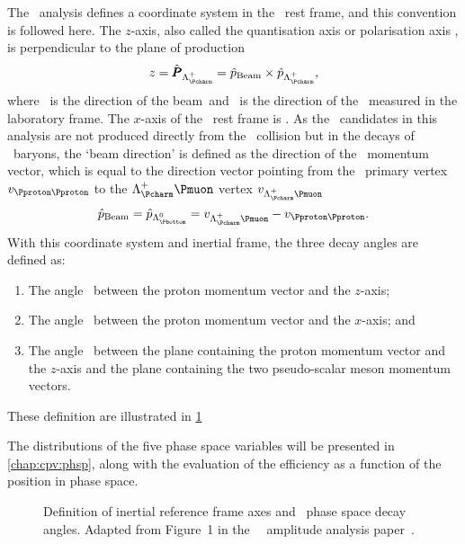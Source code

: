 The \esno\ analysis defines a coordinate system in the \PLambdac\ rest frame, 
and this convention is followed here.
The $z$-axis, also called the quantisation axis or polarisation axis \polzlcp, 
is perpendicular to the plane of production
\begin{equation}
  z = \polzlcp = \phatbeam \times \phatlcp,
\end{equation}
where \phatbeam\ is the direction of the beam\footnotemark\ and \phatlcp\ is 
the direction of the \PLambdac\ measured in the laboratory frame.
The $x$-axis of the \PLambdac\ rest frame is \phatlcp.
As the \PLambdac\ candidates in this analysis are not produced directly from 
the \pp\ collision but in the decays of \PLambdab\ baryons, the `beam 
direction' is defined as the direction of the \PLambdab\ momentum vector, which 
is equal to the direction vector pointing from the \pp\ primary vertex 
$v_{\pp}$ to the $\PLambdac\Pmuon$ vertex $v_{\PLambdac\Pmuon}$
\begin{equation}
  \phatbeam = \phatlbz = v_{\PLambdac\Pmuon} - v_{\pp}.
\end{equation}
With this coordinate system and inertial frame, the three decay angles are 
defined as:
\begin{enumerate}
  \item The angle \thetap\ between the proton momentum vector and the $z$-axis;
  \item The angle \phip\ between the proton momentum vector and the $x$-axis; 
    and
  \item The angle \phihh\ between the plane containing the proton momentum 
    vector and the $z$-axis and the plane containing the two pseudo-scalar 
    meson momentum vectors.
\end{enumerate}
These definition are illustrated in \cref{fig:cpv:theory:phsp:angles}

The distributions of the five phase space variables will be presented in 
\cref{chap:cpv:phsp}, along with the evaluation of the efficiency as a function 
of the position in phase space.

\begin{figure}
  \begin{subfigure}{0.5\textwidth}
    \resizebox{\textwidth}{!}{%
      
    }
  \end{subfigure}
  \begin{subfigure}{0.5\textwidth}
    \resizebox{\textwidth}{!}{%
      
    }
  \end{subfigure}
  \caption{%
    Definition of inertial reference frame axes and \LcTophh\ phase space decay 
    angles.
    Adapted from Figure~1 in the \esno\ \LcTopKpi\ amplitude analysis 
    paper~\cite{Aitala:1999uq}.
  }
  \label{fig:cpv:theory:phsp:angles}
\end{figure}
